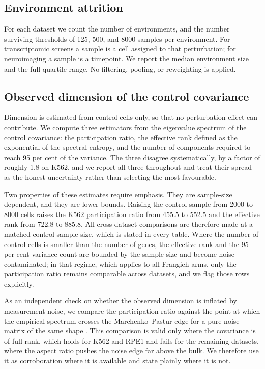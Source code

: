 \documentclass[journal,twoside,web]{ieeecolor}
\begin{document}
\subsection{Environment attrition}
For each dataset we count the number of environments, and the number surviving
thresholds of 125, 500, and 8000 samples per environment. For transcriptomic
screens a sample is a cell assigned to that perturbation; for neuroimaging a
sample is a timepoint. We report the median environment size and the full
quartile range. No filtering, pooling, or reweighting is applied.

\subsection{Observed dimension of the control covariance}
Dimension is estimated from control cells only, so that no perturbation effect
can contribute. We compute three estimators from the eigenvalue spectrum of
the control covariance: the participation ratio, the effective rank defined as
the exponential of the spectral entropy, and the number of components required
to reach 95 per cent of the variance. The three disagree systematically, by a
factor of roughly 1.8 on K562, and we report all three throughout and treat
their spread as the honest uncertainty rather than selecting the most
favourable.

Two properties of these estimates require emphasis. They are sample-size
dependent, and they are lower bounds. Raising the control sample from 2000 to
8000 cells raises the K562 participation ratio from 455.5 to 552.5 and the
effective rank from 722.8 to 885.8. All cross-dataset comparisons are
therefore made at a matched control sample size, which is stated in every
table. Where the number of control cells is smaller than the number of genes,
the effective rank and the 95 per cent variance count are bounded by the
sample size and become noise-contaminated; in that regime, which applies to
all Frangieh arms, only the participation ratio remains comparable across
datasets, and we flag those rows explicitly.

As an independent check on whether the observed dimension is inflated by
measurement noise, we compare the participation ratio against the point at
which the empirical spectrum crosses the Marchenko--Pastur edge for a
pure-noise matrix of the same shape \cite{marchenko1967}. This comparison is
valid only where the covariance is of full rank, which holds for K562 and RPE1
and fails for the remaining datasets, where the aspect ratio pushes the noise
edge far above the bulk. We therefore use it as corroboration where it is
available and state plainly where it is not.
\end{document}

